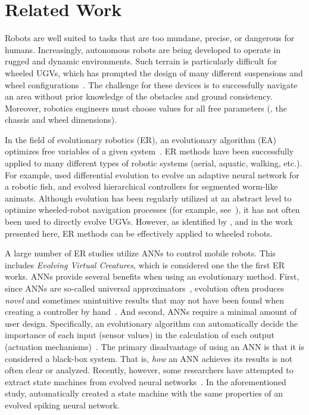 \section{Related Work}
\label{sec:related-work}

Robots are well suited to tasks that are too mundane, precise, or dangerous for humans.
%
Increasingly, autonomous robots are being developed to operate in rugged and dynamic environments.
%
Such terrain is particularly difficult for wheeled UGVs, which has prompted the design of many different suspensions and wheel configurations~\autocite{Seeni.Mobility.InTech.2010}.
%
The challenge for these devices is to successfully navigate an area without prior knowledge of the obstacles and ground consistency.
%
Moreover, robotics engineers must choose values for all free parameters (\eg{}, the chassis and wheel dimensions).


In the field of evolutionary robotics (ER), an evolutionary algorithm (EA) optimizes free variables of a given system~\autocite{Silva.EvolComp.Issues-ER.2016}.
%
ER methods have been successfully applied to many different types of robotic systems (aerial, aquatic, walking, etc.).
%
For example, \textcite{Clark.GECCO.MFAC.2015} used differential evolution to evolve an adaptive neural network for a robotic fish, and \textcite{Moore.2017.GECCO.Animat} evolved hierarchical controllers for segmented worm-like animats.
%
Although evolution has been regularly utilized at an abstract level to optimize wheeled-robot navigation processes (for example, see~\autocite{Gomes.2015.GECCO.Maze}), it has not often been used to directly evolve UGVs.
%
However, as identified by \textcite{Bongard.2013.CACM.ER}, and in the work presented here, ER methods can be effectively applied to wheeled robots.


A large number of ER studies utilize ANNs to control mobile robots. This includes \textcite{Sims.1994.CGIT.Creatures}  \emph{Evolving Virtual Creatures}, which is considered one the the first ER works.
%
ANNs  provide several benefits when using an evolutionary method.
%
First, since ANNs are so-called universal approximators~\autocite{Hornik.1989.NN.UniversalANN}, evolution often produces \emph{novel} and sometimes unintuitive results that may not have been found when creating a controller by hand~\autocite{Bongard.2013.CACM.ER}.
%
And second, ANNs require a minimal amount of user design. Specifically, an evolutionary algorithm can automatically decide the importance of each input (sensor values) in the calculation of each output (actuation mechanisms)~\autocite{Stanley.2002.EC.NEAT}.
%
The primary disadvantage of using an ANN is that it is considered a black-box system. That is, \emph{how} an ANN achieves its results is not often clear or analyzed.
%
Recently, however, some researchers have attempted to extract state machines from evolved neural networks~\autocite{Wrobel.2017.SSCI.VSSNN}.
%
In the aforementioned study, \textcite{Wrobel.2017.SSCI.VSSNN} automatically created a state machine with the same properties of an evolved spiking neural network.
